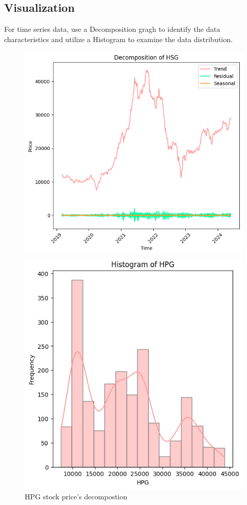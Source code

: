 \documentclass{ieeeojies}
\begin{document}
\subsection{Visualization}
For time series data, use a Decomposition gragh to identify the data characteristics and utilize a Histogram to examine the data distribution.
\begin{figure}[H]
    \centering
    \begin{minipage}{0.23\textwidth}
    \centering
    \includegraphics[width=1\textwidth]{bibliography/Figure/Decomposition_HPG.png}
    \caption{HPG stock price's decompostion}
    \label{fig:1}
    \end{minipage}
    \hfill
    \begin{minipage}{0.23\textwidth}
    \centering
    \includegraphics[width=1\textwidth]{bibliography/Figure/Histogram_HPG.png}

\end{minipage}
\end{figure}
\end{document}
